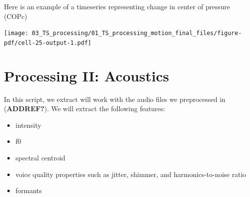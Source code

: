 \documentclass[
  letterpaper,
  DIV=11,
  numbers=noendperiod]{scrreprt}
\providecommand{\tightlist}{%
  \setlength{\itemsep}{0pt}\setlength{\parskip}{0pt}}\usepackage{longtable,booktabs,array}
\begin{document}
Here is an example of a timeseries representing change in center of
pressure (COPc)

\texttt{[image: 03\_TS\_processing/01\_TS\_processing\_motion\_final\_files/figure-pdf/cell-25-output-1.pdf]}


\chapter{Processing II: Acoustics}\label{processing-ii-acoustics}

In this script, we extract will work with the audio files we
preprocessed in (\textbf{ADDREF?}). We will extract the following
features:

\begin{itemize}
\tightlist
\item
  intensity
\item
  f0
\item
  spectral centroid
\item
  voice quality properties such as jitter, shimmer, and
  harmonics-to-noise ratio
\item
  formants
\end{itemize}
\end{document}
